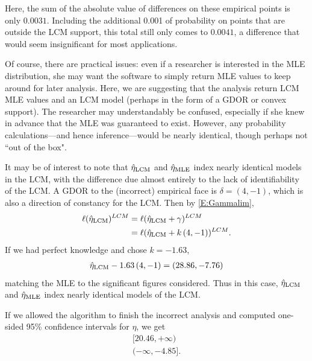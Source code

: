 Here, the sum of the absolute value of differences on these empirical points is only 
$0.0031$.  Including the additional 0.001 of probability on points that are outside 
the LCM support, this total still only comes to $0.0041$, a difference that would seem 
insignificant for most applications.  

Of course, there are practical issues: even if a researcher is interested in the 
MLE distribution, she may want the software to simply 
return MLE values to keep around for later analysis.  Here, we are suggesting that the 
analysis return LCM MLE values and an LCM model (perhaps in the form of a GDOR or
convex support).  
The researcher may understandably be confused, especially if she knew in 
advance that the MLE was guaranteed to exist.  However, any probability calculations---and hence inference---would be nearly identical, though perhaps not ``out of the box".

It may be of interest to note that $\hat{\eta}_{\textrm{LCM}}$ and $\hat{\eta}_{\textrm{MLE}}$ index nearly identical 
models in the LCM, with the difference due almost entirely to the lack of 
identifiability of the LCM.  A GDOR to the (incorrect) empirical face is 
$\delta = (4,-1)$, which is also a direction of constancy for the LCM. 
Then by \eqref{E:Gammalim}, 
\begin{align*}
	\ell(\hat{\eta}_{\textrm{LCM}})^{LCM} &= \ell( \hat{\eta}_{\textrm{LCM}} + \gamma )^{LCM}\\
				 &= 	\ell(\hat{\eta}_{\textrm{LCM}} + k \, (4,-1))^{LCM}.
\end{align*}
If we had perfect knowledge and chose $k = -1.63$,
\begin{align*}
	\hat{\eta}_{\textrm{LCM}}  -1.63 \, (4,-1)= (28.86, -7.76) 
\end{align*}
matching the MLE to the significant figures considered.  Thus in this case, $\hat{\eta}_{\textrm{LCM}}$ 
and $\hat{\eta}_{\textrm{MLE}}$ index nearly identical models of the LCM.

If we allowed the algorithm to finish the incorrect analysis and computed 
one-sided 95\% confidence intervals for $\eta$, we get 
\begin{align*}
	[20.46, +\infty)\\
	(-\infty, -4.85].
\end{align*}



